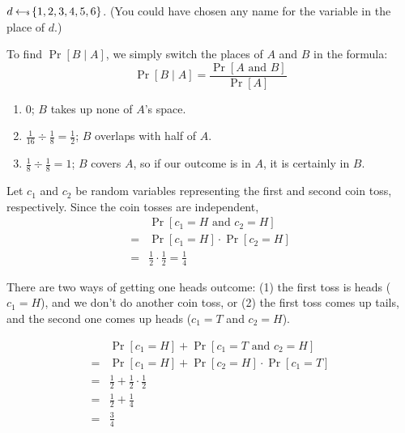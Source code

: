 \begin{answer}
    $d \hskip2.3pt{\gets\!\!\mbox{\tiny${\$}$\normalsize}}\, \{1, 2, 3, 4, 5, 6\}$. (You could have chosen any name for the variable in the place of $d$.)
\end{answer}

\begin{answer}
    \color{blue} %
    To find $\Pr[B \mid A]$, we simply switch the places of $A$ and $B$ 
    in the formula:
    \[
        \Pr[B \mid A] = \frac{\Pr[A \text{ and } B]}{\Pr[A]}
    \]
    \renewcommand{\labelenumi}{(\alph{enumi})} 
    \begin{enumerate}
        \item 0; $B$ takes up none of $A$'s space.
        \item $\frac{1}{16} \div \frac{1}{8} = \frac{1}{2}$; $B$ overlaps 
        with half of $A$.
        \item $\frac{1}{8} \div \frac{1}{8} = 1$; $B$ covers $A$, so if our 
        outcome is in $A$, it is certainly in $B$.
    \end{enumerate}
\end{answer}

\begin{answer}
    Let $c_1$ and $c_2$ be random variables representing the first and second
    coin toss, respectively. Since the coin tosses are independent, 
    \begin{align*}
        & \Pr[c_1=H \text{ and } c_2=H]\\
        =& \Pr[c_1=H] \cdot \Pr[c_2=H]\\
        =& \frac{1}{2} \cdot \frac{1}{2} = \frac{1}{4}
    \end{align*}
\end{answer}

\begin{answer}
    There are two ways of getting one heads outcome: (1) the first toss is heads 
    ($c_1=H$), and we don't do another coin toss, or (2) the first toss comes up tails,
    and the second one comes up heads ($c_1=T$ and $c_2=H$). 
    
    \begin{align*}
        & \Pr[c_1=H] + \Pr[c_1=T \text{ and } c_2=H]\\
        =& \Pr[c_1=H] + \Pr[c_2=H] \cdot \Pr[c_1=T] 
        \tag{coin tosses are independent events}\\
        =& \frac{1}{2} + \frac{1}{2}\cdot\frac{1}{2}\\
        =& \frac{1}{2} + \frac{1}{4}\\
        =& \frac{3}{4}
    \end{align*}
\end{answer}

